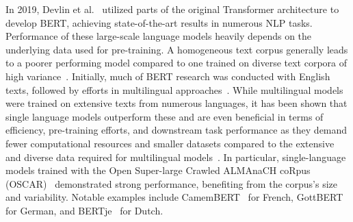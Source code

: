 In 2019, Devlin et al.~\cite{devlin2019bert} utilized parts of the original
Transformer architecture to develop BERT, achieving state-of-the-art results in
numerous NLP tasks. Performance of these large-scale language models heavily
depends on the underlying data used for pre-training. A homogeneous text corpus
generally leads to a poorer performing model compared to one trained on diverse
text corpora of high variance~\cite{martin2020camembert}. Initially, much of
BERT research was conducted with English texts, followed by efforts in
multilingual approaches~\cite{conneau2020unsupervised}. While multilingual
models were trained on extensive texts from numerous languages, it has been
shown that single language models outperform these and are even beneficial in
terms of efficiency, pre-training efforts, and downstream task performance as
they demand fewer computational resources and smaller datasets compared to the
extensive and diverse data required for multilingual
models~\cite{scheible2020gottbert, chan2020german, martin2020camembert}. In
particular, single-language models trained with the Open Super-large Crawled
ALMAnaCH coRpus (OSCAR)~\cite{suarez2019asynchronous} demonstrated strong
performance, benefiting from the corpus's size and variability. Notable examples
include CamemBERT~\cite{martin2020camembert} for French,
GottBERT~\cite{scheible2020gottbert} for German, and BERTje~\cite{de2019bertje}
for Dutch.

